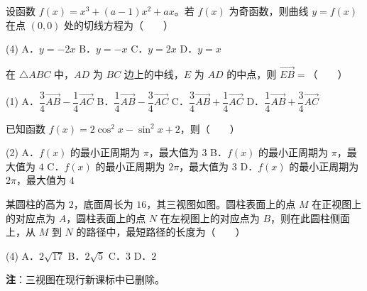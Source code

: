 \begin{question}
设函数 $f(x)=x^{3}+(a-1)x^{2}+ax$。若 $f(x)$ 为奇函数，则曲线 $y=f(x)$ 在点 $(0,0)$ 处的切线方程为\mbox{（　　）}

\begin{gkopts}(4)
\task A．$y=-2x$
\task B．$y=-x$
\task C．$y=2x$
\task D．$y=x$
\end{gkopts}

\end{question}
\begin{question}
在 $\triangle ABC$ 中，$AD$ 为 $BC$ 边上的中线，$E$ 为 $AD$ 的中点，则 $\overrightarrow{EB}=$\mbox{（　　）}

\begin{gkopts}(1)
\task A．$\dfrac34\overrightarrow{AB}-\dfrac14\overrightarrow{AC}$
\task B．$\dfrac14\overrightarrow{AB}-\dfrac34\overrightarrow{AC}$
\task C．$\dfrac34\overrightarrow{AB}+\dfrac14\overrightarrow{AC}$
\task D．$\dfrac14\overrightarrow{AB}+\dfrac34\overrightarrow{AC}$
\end{gkopts}

\end{question}
\begin{question}
已知函数 $f(x)=2\cos^{2}x-\sin^{2}x+2$，则\mbox{（　　）}

\begin{gkopts}(2)
\task A．$f(x)$ 的最小正周期为 $\pi$，最大值为 $3$
\task B．$f(x)$ 的最小正周期为 $\pi$，最大值为 $4$
\task C．$f(x)$ 的最小正周期为 $2\pi$，最大值为 $3$
\task D．$f(x)$ 的最小正周期为 $2\pi$，最大值为 $4$
\end{gkopts}

\Needspace{0.4\textheight}
\end{question}
\begin{question}
某圆柱的高为 $2$，底面周长为 $16$，其三视图如图。圆柱表面上的点 $M$ 在正视图上的对应点为 $A$，圆柱表面上的点 $N$ 在左视图上的对应点为 $B$，则在此圆柱侧面上，从 $M$ 到 $N$ 的路径中，最短路径的长度为\mbox{（　　）}
\nopagebreak[4]
\begin{center}\end{center}
\nopagebreak[4]
\begin{gkopts}(4)
\task A．$2\sqrt{17}$
\task B．$2\sqrt5$
\task C．$3$
\task D．$2$
\end{gkopts}

\begin{gktip}
\textbf{注}：三视图在现行新课标中已删除。
\end{gktip}

\end{question}
